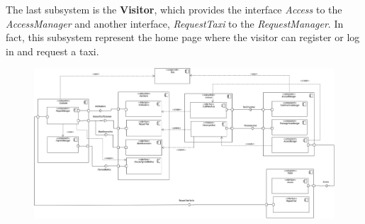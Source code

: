 		The last subsystem is the \textbf{Visitor}, which provides the interface \textit{Access} to the \textit{AccessManager} and another interface, \textit{RequestTaxi} to the \textit{RequestManager}. In fact, this subsystem represent the home page where the visitor can register or log in and request a taxi.
		
		
		\begin{landscape}
			\newpage
			\begin{figure}[!h]
				\includegraphics[scale=0.41]{Diagrams/componentDiagram.png}
			\end{figure}
		\end{landscape}
		
	\newpage	
